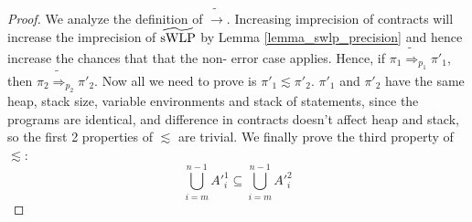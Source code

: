 \documentclass {article}
\newcommand{\imp}{\Rightarrow}
\begin{document}
\begin{proof}
We analyze the definition of $\widetilde{\rightarrow}$. Increasing imprecision of contracts will increase the imprecision of $\widetilde{\textup{sWLP}}$ by Lemma \ref{lemma_swlp_precision} and hence increase the chances that that the non- error case applies. Hence, if $\pi_1 \widetilde{\imp}_{p_1} \pi'_1$, then $\pi_2 \widetilde{\imp}_{p_2} \pi'_2$. Now all we need to prove is $\pi'_1 \lesssim \pi'_2$. $\pi'_1$ and $\pi'_2$ have the same heap, stack size, variable environments and stack of statements, since the programs are identical, and difference in contracts doesn't affect heap and stack, so the first 2 properties of $\lesssim$ are trivial. We finally prove the third property of $\lesssim$: $$\bigcup_{i = m}^{n - 1} A'^1_i  \subseteq \bigcup_{i=m}^{n - 1} A'^2_i$$


\end{proof}
\end{document}
